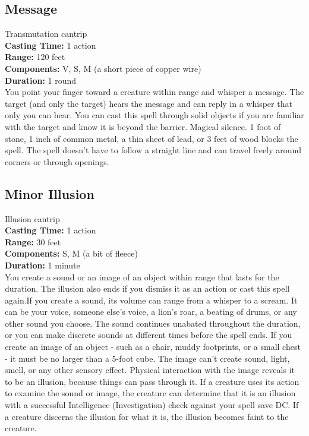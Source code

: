 \documentclass[11pt, A4paper, english]{article}
\begin{document}
		\subsection{Message}
Transmutation cantrip \\
\textbf{Casting Time:} 1 action \\
\textbf{Range:} 120 feet \\
\textbf{Components:} V, S, M (a short piece of copper wire) \\
\textbf{Duration:} 1 round \\
You point your finger toward a creature within range and whisper a message. The target (and only the target) hears the message and can reply in a whisper that only you can hear. You can cast this spell through solid objects if you are familiar with the target and know it is beyond the barrier. Magical silence.  1  foot of stone,  1  inch of common metal, a thin sheet of lead, or 3 feet of wood blocks the spell. The spell doesn't have to follow a straight line and can travel freely around corners or through openings.

		\subsection{Minor Illusion}
Illusion cantrip \\
\textbf{Casting Time:} 1 action \\
\textbf{Range:} 30 feet \\
\textbf{Components:} S, M (a bit of fleece) \\
\textbf{Duration:} 1 minute \\
You create a sound or an image of an object within range that lasts for the duration. The illusion also ends if you dismiss it as an action or cast this spell again.If you create a sound, its volume can range from a whisper to a scream. It can be your voice, someone else's voice, a lion's roar, a beating of drums, or any other sound you choose. The sound continues unabated throughout the duration, or you can make discrete sounds at different times before the spell ends. If you create an image of an object - such as a chair, muddy footprints, or a small chest - it must be no larger than a 5-foot cube. The image can't create sound, light, smell, or any other sensory effect. Physical interaction with the image reveals it to be an illusion, because things can pass through it. If a creature uses its action to examine the sound or image, the creature can determine that it is an illusion with a successful Intelligence (Investigation) check against your spell save DC. If a creature discerns the illusion for what it is, the illusion becomes faint to the creature.
\end{document}
